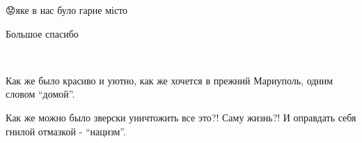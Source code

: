 
😟яке в нас було гарне місто


Большое спасибо 🙏🏻💙💛


🥺😥😢😭


Как же было красиво и уютно, как же хочется в прежний Мариуполь, одним словом
\enquote{домой}.


Как же можно было зверски уничтожить все это?! Саму жизнь?! И оправдать себя
гнилой отмазкой - \enquote{нацизм}.
